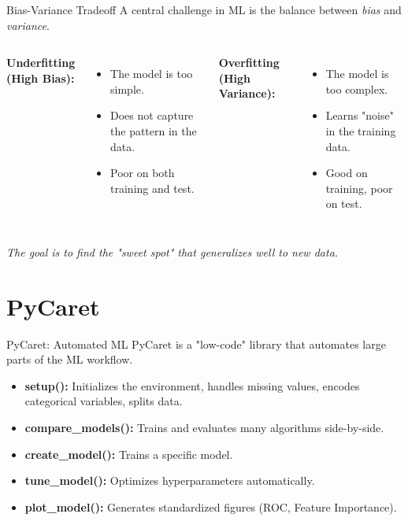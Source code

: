 \documentclass[aspectratio=169]{beamer}
\begin{document}
\begin{frame}{Bias-Variance Tradeoff}
    A central challenge in ML is the balance between \textit{bias} and \textit{variance}.
    
    \begin{columns}
        \textbf{Underfitting (High Bias):}
        \begin{itemize}
            \item The model is too simple.
            \item Does not capture the pattern in the data.
            \item Poor on both training and test.
        \end{itemize}
        
        \textbf{Overfitting (High Variance):}
        \begin{itemize}
            \item The model is too complex.
            \item Learns "noise" in the training data.
            \item Good on training, poor on test.
        \end{itemize}
    \end{columns}
    \vspace{0.5cm}
    \textit{The goal is to find the "sweet spot" that generalizes well to new data.}
\end{frame}

\section{PyCaret}
\begin{frame}{PyCaret: Automated ML}
    PyCaret is a "low-code" library that automates large parts of the ML workflow.
    
    \begin{itemize}
        \item \textbf{setup():} Initializes the environment, handles missing values, encodes categorical variables, splits data.
        \item \textbf{compare\_models():} Trains and evaluates many algorithms side-by-side.
        \item \textbf{create\_model():} Trains a specific model.
        \item \textbf{tune\_model():} Optimizes hyperparameters automatically.
        \item \textbf{plot\_model():} Generates standardized figures (ROC, Feature Importance).
    \end{itemize}
\end{frame}
\end{document}
